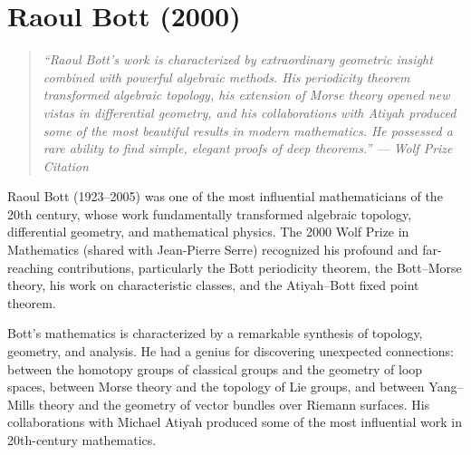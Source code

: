 \let\R\relax
\newcommand{\R}{\mathbb{R}}
\let\C\relax
\newcommand{\C}{\mathbb{C}}
\let\N\relax
\newcommand{\N}{\mathbb{N}}
\let\Z\relax
\newcommand{\Z}{\mathbb{Z}}
\let\Q\relax
\newcommand{\Q}{\mathbb{Q}}
\let\SO\relax
\newcommand{\SO}{\operatorname{SO}}
\let\SL\relax
\newcommand{\SL}{\operatorname{SL}}
\let\GL\relax
\newcommand{\GL}{\operatorname{GL}}
\let\U\relax
\newcommand{\U}{\operatorname{U}}
\let\SU\relax
\newcommand{\SU}{\operatorname{SU}}
\let\St\relax
\newcommand{\St}{\operatorname{St}}
\let\GV\relax
\newcommand{\GV}{\operatorname{GV}}
\let\E\relax
\newcommand{\E}{\operatorname{E}}
\let\KO\relax
\newcommand{\KO}{\operatorname{KO}}
\let\KU\relax
\newcommand{\KU}{\operatorname{KU}}
\let\Vect\relax
\newcommand{\Vect}{\operatorname{Vect}}
\let\ind\relax
\newcommand{\ind}{\operatorname{ind}}
\let\Aut\relax
\newcommand{\Aut}{\operatorname{Aut}}
\let\Diff\relax
\newcommand{\Diff}{\operatorname{Diff}}
\let\BU\relax
\newcommand{\BU}{\operatorname{BU}}
\let\BO\relax
\newcommand{\BO}{\operatorname{BO}}
\let\Or\relax
\newcommand{\Or}{\operatorname{O}}

\chapter{Raoul Bott (2000)}

\begin{quote}
\it ``Raoul Bott's work is characterized by extraordinary geometric insight combined with powerful algebraic methods. His periodicity theorem transformed algebraic topology, his extension of Morse theory opened new vistas in differential geometry, and his collaborations with Atiyah produced some of the most beautiful results in modern mathematics. He possessed a rare ability to find simple, elegant proofs of deep theorems.'' --- Wolf Prize Citation
\end{quote}

Raoul Bott (1923--2005) was one of the most influential mathematicians of the 20th century, whose work fundamentally transformed algebraic topology, differential geometry, and mathematical physics. The 2000 Wolf Prize in Mathematics (shared with Jean-Pierre Serre) recognized his profound and far-reaching contributions, particularly the Bott periodicity theorem, the Bott--Morse theory, his work on characteristic classes, and the Atiyah--Bott fixed point theorem.

Bott's mathematics is characterized by a remarkable synthesis of topology, geometry, and analysis. He had a genius for discovering unexpected connections: between the homotopy groups of classical groups and the geometry of loop spaces, between Morse theory and the topology of Lie groups, and between Yang--Mills theory and the geometry of vector bundles over Riemann surfaces. His collaborations with Michael Atiyah produced some of the most influential work in 20th-century mathematics.

